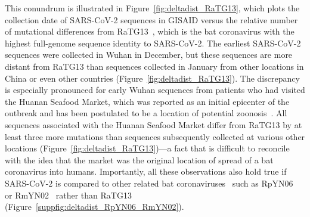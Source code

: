 \documentclass[9pt,twocolumn,twoside]{gsajnl_modified}
\begin{document}
This conundrum is illustrated in Figure~\ref{fig:deltadist_RaTG13}, which plots the collection date of SARS-CoV-2 sequences in GISAID versus the relative number of mutational differences from RaTG13~\citep{zhou2020pneumonia}, which is the bat coronavirus with the highest full-genome sequence identity to SARS-CoV-2.
The earliest SARS-CoV-2 sequences were collected in Wuhan in December, but these sequences are more distant from RaTG13 than sequences collected in January from other locations in China or even other countries (Figure~\ref{fig:deltadist_RaTG13}).
The discrepancy is especially pronounced for early Wuhan sequences from patients who had visited the Huanan Seafood Market, which was reported as an initial epicenter of the outbreak and has been postulated to be a location of potential zoonosis~\citep{WHO2021origins}.
All sequences associated with the Huanan Seafood Market differ from RaTG13 by at least three more mutations than sequences subsequently collected at various other locations (Figure~\ref{fig:deltadist_RaTG13})---a fact that is difficult to reconcile with the idea that the market was the original location of spread of a bat coronavirus into humans.
Importantly, all these observations also hold true if SARS-CoV-2 is compared to other related bat coronaviruses~\citep{lytras2021exploring} such as RpYN06~\citep{zhou2021identification} or RmYN02~\citep{zhou2020novel} rather than RaTG13 (Figure~\ref{suppfig:deltadist_RpYN06_RmYN02}).
\end{document}
